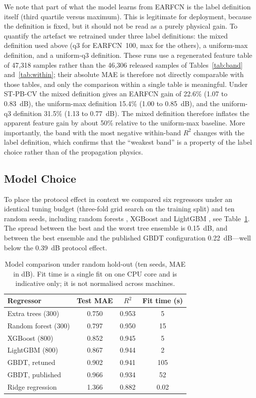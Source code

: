 \documentclass{ieeeaccess}
\begin{document}
We note that part of what the model learns from EARFCN is the label definition
itself (third quartile versus maximum). This is legitimate for deployment, because
the definition is fixed, but it should not be read as a purely physical gain.
To quantify the artefact we retrained under three label definitions: the mixed
definition used above (q3 for EARFCN~100, max for the others), a uniform-max
definition, and a uniform-q3 definition. These runs use a regenerated feature
table of 47{,}318 samples rather than the 46{,}306 released samples of
Tables~\ref{tab:band} and~\ref{tab:within}; their absolute MAE is therefore not
directly comparable with those tables, and only the comparison within a single
table is meaningful. Under ST-PB-CV the mixed definition gives an EARFCN gain of
22.6\% (1.07 to 0.83~dB), the uniform-max definition 15.4\% (1.00 to 0.85~dB),
and the uniform-q3 definition 31.5\% (1.13 to 0.77~dB). The mixed definition
therefore inflates the apparent feature gain by about 50\% relative to the
uniform-max baseline. More importantly, the band with the most negative
within-band $R^2$ changes with the label definition, which confirms that the
``weakest band'' is a property of the label choice rather than of the
propagation physics.

\subsection{Model Choice}
To place the protocol effect in context we compared six regressors under an
identical tuning budget (three-fold grid search on the training split) and ten
random seeds, including random forests \cite{breiman,breiman1996,liaw2002}, XGBoost \cite{chen2016} and LightGBM \cite{ke2017}, see Table~\ref{tab:models}. The spread between the best and the
worst tree ensemble is 0.15~dB, and between the best ensemble and the published
GBDT configuration 0.22~dB---well below the 0.39~dB protocol effect.

\begin{table}
\caption{Model comparison under random hold-out (ten seeds, MAE in dB). Fit
time is a single fit on one CPU core and is indicative only; it is not
normalised across machines.}
\label{tab:models}
\setlength{\tabcolsep}{3pt}
\begin{tabular}{|l|c|c|c|}
\hline
Regressor & Test MAE & $R^2$ & Fit time (s)\\
\hline
Extra trees (300) & 0.750 & 0.953 & 5\\
Random forest (300) & 0.797 & 0.950 & 15\\
XGBoost (800) & 0.852 & 0.945 & 5\\
LightGBM (800) & 0.867 & 0.944 & 2\\
GBDT, retuned & 0.902 & 0.941 & 105\\
GBDT, published \cite{zeng2024} & 0.966 & 0.934 & 52\\
Ridge regression & 1.366 & 0.882 & 0.02\\
\hline
\end{tabular}
\end{table}
\end{document}
